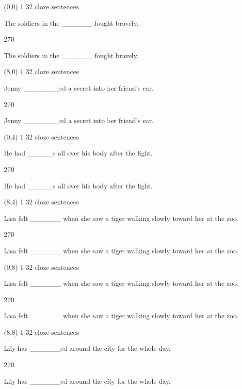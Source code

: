\documentclass[a4paper]{article}
\newenvironment{itemize*}%
{\begin{itemize}%
 \setlength{\itemsep}{0.5cm}%
 \setlength{\parsep}{0pt}%
 \setlength{\parskip}{0pt}}%
{\end{itemize}}
\newcommand{\mycard}[3]{%
	\small #1 #2
	\par
	\parbox[t][6.8cm][c]{9.5cm}{%
	\par
	\myleft{#3}
	\par
	\myright{#3}
	}
}
\newcommand{\myleft}[1]{%
	\begin{sideways}
	\hspace*{-0.9cm}
		\parbox[t][2.7cm][t]{6.5cm}{%
		\large #1
		}
	\end{sideways}
}
\newcommand{\myright}[1]{%
	\hspace*{6.5cm}
	\begin{turn}{270}
	\hspace*{-7.1cm}
		\parbox[t][2.7cm][t]{6.5cm}{%
		\large #1
		}
	\end{turn}
}
\begin{document}
\null
\newpage

\begin{textblock}{8}(0,0)
\mycard{1}{32 cloze sentences}{
\begin{itemize*}
\item The soldiers in the \_\_\_\_\_\_ fought bravely.
\end{itemize*}
}
\end{textblock}

\begin{textblock}{8}(8,0)
\mycard{1}{32 cloze sentences}{
\begin{itemize*}
\item Jenny \_\_\_\_\_\_\_ed a secret into her friend's ear.
\end{itemize*}
}
\end{textblock}

\begin{textblock}{8}(0,4)
\mycard{1}{32 cloze sentences}{
\begin{itemize*}
\item He had \_\_\_\_\_s all over his body after the fight.
\end{itemize*}
}
\end{textblock}

\begin{textblock}{8}(8,4)
\mycard{1}{32 cloze sentences}{
\begin{itemize*}
\item Lisa felt \_\_\_\_\_\_ when she saw a tiger walking slowly toward her at the zoo.
\end{itemize*}
}
\end{textblock}

\begin{textblock}{8}(0,8)
\mycard{1}{32 cloze sentences}{
\begin{itemize*}
\item Lisa felt \_\_\_\_\_\_ when she saw a tiger walking slowly toward her at the zoo.
\end{itemize*}
}
\end{textblock}

\begin{textblock}{8}(8,8)
\mycard{1}{32 cloze sentences}{
\begin{itemize*}
\item Lily has \_\_\_\_\_\_ed around the city for the whole day.
\end{itemize*}
}
\end{textblock}
\end{document}
